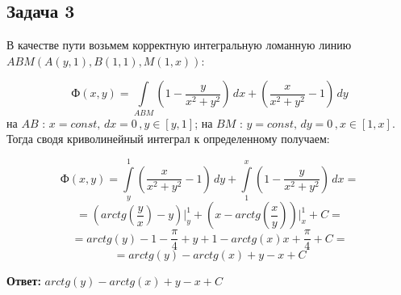 \documentclass[12pt]{article}
\begin{document}
	\subsection*{Задача 3}
	В качестве пути возьмем корректную интегральную ломанную линию \\$ ABM(A(y,1),B(1,1),M(1,x)) $:

	$$ Ф(x,y) = \int \limits_{ABM} (1-\frac{y}{x^2+y^2})\,dx + (\frac{x}{x^2+y^2}-1)\, dy $$
	на $ AB $ : $ x = const, \, dx = 0\, , y\in [y,1] $; на $ BM $ : $ y = const, \, dy = 0\, , x\in [1,x] $. Тогда сводя криволинейный интеграл к определенному получаем:

	$$ Ф(x,y) = \int \limits_y^1 (\frac{x}{x^2+y^2}-1)\, dy + \int \limits_1^x (1-\frac{y}{x^2+y^2})\,dx = $$
	$$ = (arctg(\frac{y}{x}) - y)\Big|_y^1 + (x - arctg(\frac{x}{y}))\Big|_x^1 + C = $$
	$$ = arctg(y) - 1 -  \frac{\pi}{4} + y + 1 - arctg(x) x + \frac{\pi}{4} + C = $$
	$$ = arctg(y) - arctg(x) + y - x + C $$

	\hspace{240pt}\textbf{Ответ:} $ arctg(y) - arctg(x) + y - x + C $
	
\end{document}
